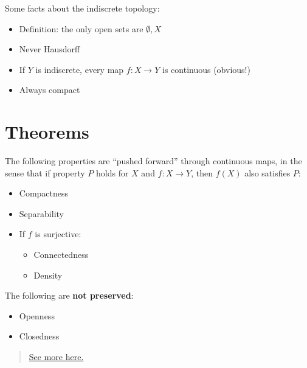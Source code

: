 \begin{example}

Some facts about the indiscrete topology:

\begin{itemize}
\tightlist
\item
  Definition: the only open sets are \(\emptyset, X\)
\item
  Never Hausdorff
\item
  If \(Y\) is indiscrete, every map \(f:X\to Y\) is continuous
  (obvious!)
\item
  Always compact
\end{itemize}

\end{example}

\hypertarget{theorems}{%
\section{Theorems}\label{theorems}}

\begin{proposition}

The following properties are ``pushed forward'' through continuous maps,
in the sense that if property \(P\) holds for \(X\) and \(f:X\to Y\),
then \(f(X)\) also satisfies \(P\):

\begin{itemize}
\tightlist
\item
  Compactness
\item
  Separability
\item
  If \(f\) is surjective:

  \begin{itemize}
  \tightlist
  \item
    Connectedness
  \item
    Density
  \end{itemize}
\end{itemize}

The following are \textbf{not preserved}:

\begin{itemize}
\tightlist
\item
  Openness
\item
  Closedness
\end{itemize}

\begin{quote}
\href{https://people.clas.ufl.edu/groisser/files/cont_img_preimg.pdf}{See
more here.}
\end{quote}

\end{proposition}

